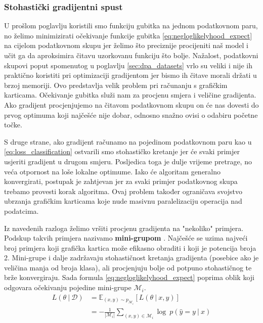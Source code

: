 \documentclass[times, utf8, diplomski]{fer}
\def\expect{\mathbb{E}}
\def\probsep{\ |\ }
\def\dataset{\mathcal{D}}
\def\minibatch{\mathcal{M}}
\begin{document}
\subsubsection{Stohastički gradijentni spust}
U prošlom poglavlju koristili smo funkciju gubitka na jednom podatkovnom paru, no želimo minimizirati očekivanje funkcije gubitka \eqref{eq:negloglikelyhood_expect} na cijelom podatkovnom skupu jer želimo što preciznije procijeniti naš model i učit ga da aproksimira čitavu uzorkovanu funkciju što bolje. Nažalost, podatkovni skupovi poput spomenutog u poglavlju \ref{sec:dpa_datasets} vrlo su veliki i nije ih praktično koristiti pri optimizaciji gradijentom jer bismo ih čitave morali držati u brzoj memoriji. Ovo predstavlja velik problem pri računanju s grafičkim karticama. Očekivanje gubitka služi nam za procjenu smjera i veličine gradijenta. Ako gradijent procjenjujemo na čitavom podatkovnom skupu on će nas dovesti do prvog optimuma koji najčešće nije dobar, odnosno snažno ovisi o odabiru početne točke. 

S druge strane, ako gradijent računamo na pojedinom podatkovnom paru kao u \eqref{eq:loss_classification} ostvarili smo stohastičko kretanje jer će svaki primjer usjeriti gradijent u drugom smjeru. Posljedica toga je dulje vrijeme pretrage, no veća otpornost na loše lokalne optimume. Iako će algoritam generalno konvergirati, postupak je zahtjevan jer za svaki primjer podatkovnog skupa trebamo provesti korak algoritma. Ovaj problem također ograničava svojstvo ubrzanja grafičkim karticama koje nude masivnu paralelizaciju operacija nad podatcima.

Iz navedenih razloga želimo vršiti procjenu gradijenta na "nekoliko" primjera. Podskup takvih primjera nazivamo \textbf{mini-grupom} . Najčešće se uzima najveći broj primjera koji grafička kartica može efikasno obraditi i koji je potencija broja 2. Mini-grupe i dalje zadržavaju stohastičnost kretanja gradijenta (posebice ako je veličina manja od broja klasa), ali procjenjuju bolje od potpuno stohastičnog te brže konvergiraju. Sada formula \eqref{eq:negloglikelyhood_expect} poprima oblik koji odgovara očekivanju pojedine mini-grupe $\minibatch_i$.
\begin{equation}
\label{eq:negloglikelyhood_expect}
\begin{split}
L(\theta \probsep \dataset) &= \expect_{(x,y) \sim p_{\minibatch_i}}[L(\theta \probsep x,y)] \\
&= -\frac{1}{|\minibatch_i|} \sum_{(x,y)\in\minibatch_i} \log\ p(\hat{y}=y \probsep x)
\end{split}
\end{equation}
\end{document}
